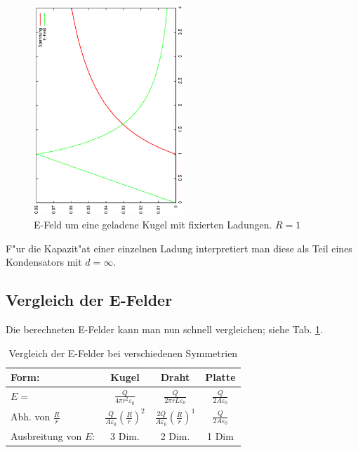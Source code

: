 \begin{figure}
   \centering
   \includegraphics[width=0.5\textwidth,angle=-90]{bilder/kugel}
   \caption[E-Feld einer Kugel]{E-Feld um eine geladene Kugel mit
     fixierten Ladungen. $R = 1$}
   \label{abb_efeld_kugel}
\end{figure}



\begin{Wichtig}
   F"ur die Kapazit"at einer einzelnen Ladung interpretiert man diese
   als Teil eines Kondensators mit $d = \infty$.
\end{Wichtig}





\subsection{Vergleich der E-Felder}
\label{kap_vergleich-e-felder}

Die berechneten E-Felder kann man nun schnell vergleichen; siehe
Tab. \ref{tab_glg_e-feld_symmetrie}.

\begin{table}[h]
   \centering
   \begin{tabular}{l c c c}
      \toprule
      Form: & \textbf{Kugel} & \textbf{Draht} & \textbf{Platte}\\
      \midrule
      $E = $ &
      $\frac{Q}{4\pi r^2 \varepsilon_0} $  &
      $ \frac{Q}{2\pi r L \varepsilon_0}$ &
      $\frac{Q}{2A \varepsilon_0}$
    \\
      Abh. von $\frac{R}{r}$ &  $\frac{Q}{A \varepsilon_0}\left ( \frac{R}{r} \right )^2$&
      $\frac{2Q}{A \varepsilon_0} \left ( \frac{R}{r} \right )^1$&
      $\frac{Q}{2A \varepsilon_0}$
    \\
      Ausbreitung von $E$: & 3 Dim. & 2 Dim. & 1 Dim\\
      \bottomrule
\end{tabular}
   \caption{Vergleich der E-Felder bei verschiedenen Symmetrien}
   \label{tab_glg_e-feld_symmetrie}
\end{table}







